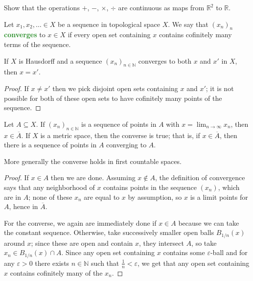\documentclass[11pt]{scrartcl}
\providecommand{\ol}{\overline}
\providecommand{\eps}{\varepsilon}
\providecommand{\NN}{\mathbb N}
\providecommand{\RR}{\mathbb R}
\providecommand{\vocab}[1]{{\textbf{\textcolor{ForestGreen}{#1}}}}
\begin{document}
\begin{exercise}
    Show that the operations $+$, $-$, $\times$, $\div$
    are continuous as maps from $\RR^2$ to $\RR$.
\end{exercise}

\begin{definition}[Convergence]
    \label{def:convergence}
    Let $x_1,x_2,\ldots\in X$ be a sequence in topological space $X$.
    We say that $(x_n)_n$ \vocab{converges} to $x\in X$ if
    every open set containing $x$ contains cofinitely many terms
    of the sequence.
\end{definition}

\begin{prop}
    \label{prop:hausdorff-limits-unique}
    If $X$ is Hausdorff and a sequence $(x_n)_{n\in\NN}$ converges
    to both $x$ and $x'$ in $X$, then $x = x'$.
\end{prop}

\begin{proof}
    If $x\ne x'$ then we pick disjoint open sets containing $x$ and $x'$;
    it is not possible for both of these open sets to have
    cofinitely many points of the sequence.
\end{proof}

\begin{theorem}
    \label{thm:limit-points-by-seq}
    Let $A\subseteq X$. If $(x_n)_{n\in\NN}$ is a sequence of points in $A$
    with $x = \lim_{n\to\infty} x_n$, then $x\in\ol A$.
    If $X$ is a metric space, then the converse is true;
    that is, if $x\in\ol A$, then there is a sequence of points in $A$
    converging to $A$.
\end{theorem}

\begin{remark}
    More generally the converse holds in first countable spaces.
\end{remark}

\begin{proof}
    If $x\in A$ then we are done.
    Assuming $x\notin A$, the definition of convergence says that
    any neighborhood of $x$ contains points in the sequence $(x_n)$,
    which are in $A$; none of these $x_n$ are equal to $x$
    by assumption, so $x$ is a limit points for $A$, hence in $\ol A$.

    For the converse, we again are immediately done if $x\in A$
    because we can take the constant sequence.
    Otherwise, take successively smaller open balls
    $B_{1/n}(x)$ around $x$; since these are open and contain $x$,
    they intersect $A$, so take $x_n\in B_{1/n}(x)\cap A$.
    Since any open set containing $x$ contains some $\eps$-ball
    and for any $\eps>0$ there exists $n\in\NN$ such that $\frac 1n < \eps$,
    we get that any open set containing $x$ contains cofinitely many
    of the $x_n$.
\end{proof}
\end{document}
